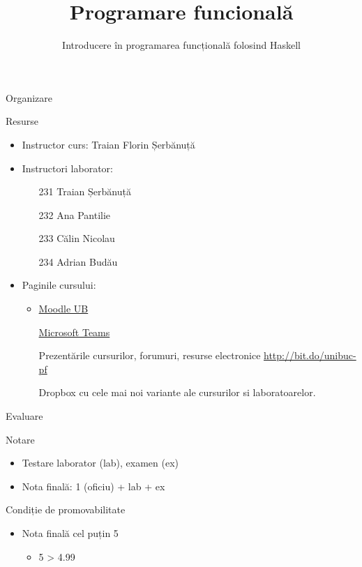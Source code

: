 \documentclass[xcolor=pdftex,romanian,colorlinks]{beamer}
\title[PF---Introducere]{Programare func\ts ional\u a}
\subtitle{Introducere în programarea funcțională folosind Haskell}
\date{}
\begin{document}
\begin{frame}
  \titlepage
\end{frame}


\begin{section}{Organizare}

\begin{frame}{Resurse}
\begin{itemize}
\item Instructor curs: Traian Florin Șerbănuță
\item Instructori laborator:
\begin{itemize}
\item[231] Traian Șerbănuță
\item[232] Ana Pantilie
\item[233] Călin Nicolau
\item[234] Adrian Budău 
\end{itemize}
\item Paginile  cursului:
\begin{itemize}
\item \href{https://moodle.unibuc.ro/course/view.php?id=4313}{Moodle UB}
\item[] \href{https://teams.microsoft.com/l/team/19\%3ac732b54e8b7542a890408ad73a8c4a1a\%40thread.tacv2/conversations?groupId=708b52c6-c4e1-455a-9190-22f87d16cdcc&tenantId=08a1a72f-fecd-4dae-8cec-471a2fb7c2f1}{Microsoft Teams}
\item[] Prezentările cursurilor, forumuri, resurse electronice
\vitem\url{http://bit.do/unibuc-pf}
\item[] Dropbox cu cele mai noi variante ale cursurilor si laboratoarelor.
\end{itemize}
\end{itemize}
\end{frame}







\begin{frame}{Evaluare}
\begin{block}{Notare}
\begin{itemize}
\item  Testare laborator (lab), examen (ex) 
\item Nota finală: 1 (oficiu) + lab  + ex 

\end{itemize}
\end{block}


\begin{block}{Condiție de promovabilitate}
\begin{itemize}
\item Nota finală \alert{cel puțin 5}
\begin{itemize}
  \item 5 > 4.99
\end{itemize}
\end{itemize}
\end{block}


\end{frame}
\end{section}
\end{document}
